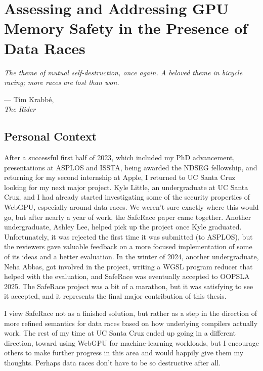 \chapter[Assessing and Addressing GPU Memory Safety in the Presence of Data Races]{Assessing and Addressing GPU Memory Safety in the Presence of Data Races}
\label{chap:saferace}

\epigraph{\textit{The theme of mutual self-destruction, once again. A beloved theme in bicycle racing; more races are lost than won.}}{--- Tim Krabb\'e, \\\footnotesize\textit{The Rider}}

\section{Personal Context}

After a successful first half of 2023, which included my PhD advancement, presentations at ASPLOS and ISSTA, being awarded the NDSEG fellowship, and returning for my second internship at Apple, I returned to UC Santa Cruz looking for my next major project. Kyle Little, an undergraduate at UC Santa Cruz, and I had already started investigating some of the security properties of WebGPU, especially around data races. We weren't sure exactly where this would go, but after nearly a year of work, the SafeRace paper came together. Another undergraduate, Ashley Lee, helped pick up the project once Kyle graduated. Unfortunately, it was rejected the first time it was submitted (to ASPLOS), but the reviewers gave valuable feedback on a more focused implementation of some of its ideas and a better evaluation. In the winter of 2024, another undergraduate, Neha Abbas, got involved in the project, writing a WGSL program reducer that helped with the evaluation, and SafeRace was eventually accepted to OOPSLA 2025. The SafeRace project was a bit of a marathon, but it was satisfying to see it accepted, and it represents the final major contribution of this thesis.

I view SafeRace not as a finished solution, but rather as a step in the direction of more refined semantics for data races based on how underlying compilers actually work. The rest of my time at UC Santa Cruz ended up going in a different direction, toward using WebGPU for machine-learning workloads, but I encourage others to make further progress in this area and would happily give them my thoughts. Perhaps data races don't have to be so destructive after all.


